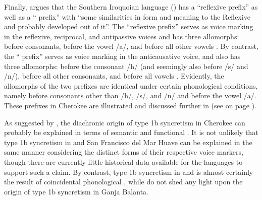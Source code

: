 \newpage

Finally, \citet[343, 347]{montgomery-anderson:2008} argues that the Southern Iroquoian language  () has a “reflexive prefix” as well as a “ prefix” with “some similarities in form and meaning to the Reflexive and probably developed out of it”. The “reflexive prefix” serves as voice marking in the reflexive, reciprocal, and antipassive voices and has three allomorphs:  before consonants,  before the vowel /a/, and  before all other vowels \citep[343]{montgomery-anderson:2008}. By contrast, the “ prefix” serves as voice marking in the anticausative voice, and also has three allomorphs:  before the consonant /h/ (and seemingly also before /s/ and /n/),  before all other consonants, and  before all vowels \citep[372]{montgomery-anderson:2008}. Evidently, the allomorphs of the two prefixes are identical under certain phonological conditions, namely before consonants other than /h/, /s/, and /n/ and before the vowel /a/. These prefixes in Cherokee are illustrated and discussed further in  (see  on page \pageref{tab:ch5:antp-refl-recp-antc-3}). 

As suggested by \citet{montgomery-anderson:2008}, the diachronic origin of type 1b syncretism in Cherokee can probably be explained in terms of semantic and functional . It is not unlikely that type 1b syncretism in  and San Francisco del Mar Huave can be explained in the same manner considering the distinct forms of their respective voice markers, though there are currently little historical data available for the languages to support such a claim. By contrast, type 1b syncretism in  and  is almost certainly the result of coincidental phonological , while \citet{creissels:biaye:2016} do not shed any light upon the origin of type 1b syncretism in Ganja Balanta. 

